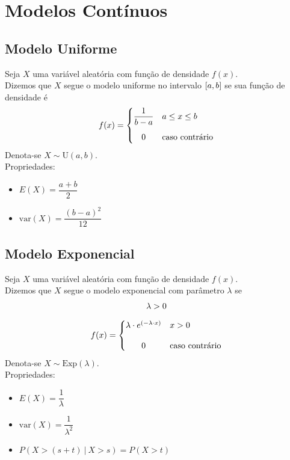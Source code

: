 \documentclass{article}
\begin{document}
\section{Modelos Contínuos}


\subsection{Modelo Uniforme}
Seja $X$ uma variável aleatória com função de densidade $f(x)$. \\
Dizemos que $X$ segue o modelo uniforme no intervalo $[a,b\hspace{0.1pt}]$ se sua função de densidade é
\[
  f(x) = \begin{cases}
          \dfrac{1}{b - a} & a \leq x \leq b \\[10pt]
          \hfil 0 & \text{caso contrário}
         \end{cases} \\[10pt]
\]
Denota-se $X \sim \text{U}(a, b)$. \\[10pt]
Propriedades:
\begin{itemize}
  \item $E(X) = \dfrac{a + b}{2}$
  \item $\text{var}(X) = \dfrac{{(b - a)}^2}{12}$
\end{itemize}


\subsection{Modelo Exponencial}
Seja $X$ uma variável aleatória com função de densidade $f(x)$. \\
Dizemos que $X$ segue o modelo exponencial com parâmetro $\lambda$ se
\begin{gather*}
  \lambda > 0 \\[5pt]
  f(x) = \begin{cases}
          \lambda \cdot e^{(-\lambda \cdot x)} &x > 0 \\[10pt]
          \hfil 0 &\text{caso contrário}
         \end{cases}
\end{gather*}
Denota-se $X \sim \text{Exp}(\lambda)$. \\[10pt]
Propriedades:
\begin{itemize}
  \item $E(X) = \dfrac{1}{\lambda}$
  \item $\text{var}(X) = \dfrac{1}{\lambda^2}$
  \item $P\left(X > (s + t) \:\big|\: X > s \right) = P(X > t)$
\end{itemize}
\end{document}
